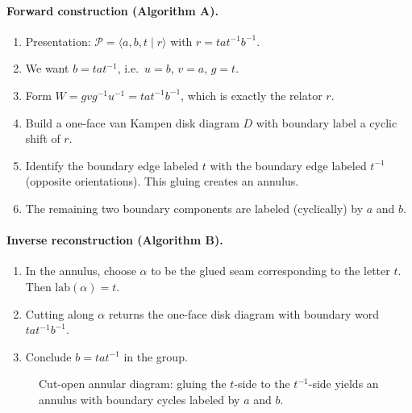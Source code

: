 \documentclass[11pt]{article}
\theoremstyle{definition}
\theoremstyle{plain}
\theoremstyle{remark}
\newcommand{\lab}{\mathrm{lab}}
\begin{document}
\paragraph{Forward construction (Algorithm A).}
\begin{enumerate}[leftmargin=2.2em]
\item Presentation: $\mathcal P=\langle a,b,t\mid r\rangle$ with $r=t a t^{-1} b^{-1}$.
\item We want $b=t a t^{-1}$, i.e.\ $u=b$, $v=a$, $g=t$.
\item Form $W=gvg^{-1}u^{-1}=t a t^{-1} b^{-1}$, which is exactly the relator $r$.
\item Build a one-face van Kampen disk diagram $D$ with boundary label a cyclic shift of $r$.
\item Identify the boundary edge labeled $t$ with the boundary edge labeled $t^{-1}$ (opposite orientations).
This gluing creates an annulus.
\item The remaining two boundary components are labeled (cyclically) by $a$ and $b$.
\end{enumerate}

\paragraph{Inverse reconstruction (Algorithm B).}
\begin{enumerate}[leftmargin=2.2em]
\item In the annulus, choose $\alpha$ to be the glued seam corresponding to the letter $t$.
Then $\lab(\alpha)=t$.
\item Cutting along $\alpha$ returns the one-face disk diagram with boundary word $t a t^{-1} b^{-1}$.
\item Conclude $b=t a t^{-1}$ in the group.
\end{enumerate}

\begin{figure}[h]
\centering
{}
\caption{Cut-open annular diagram: gluing the $t$-side to the $t^{-1}$-side yields an annulus with boundary cycles labeled by $a$ and $b$.}
\end{figure}
\clearpage
\end{document}

